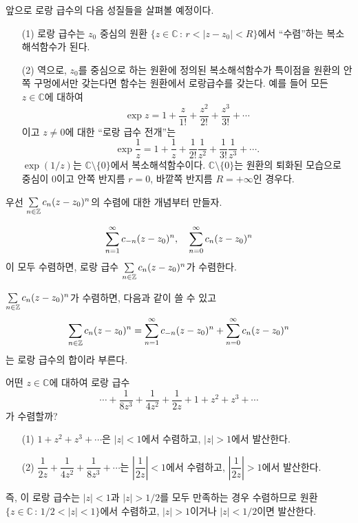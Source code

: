 앞으로 로랑 급수의 다음 성질들을 살펴볼 예정이다.
\begin{itemize}
\item[(1)] 로랑 급수는 $z_0$ 중심의 
원환 $\{ z\in \mathbb C \,:\, r < |z-z_0| <R\}$에서 ``수렴''하는
복소해석함수가 된다.
\item[(2)] 역으로, $z_0$를 중심으로 하는 원환에 정의된 복소해석함수가
특이점을 원환의 안쪽 구멍에서만 갖는다면
함수는 원환에서 로랑급수를 갖는다. 예를 들어 모든 $z\in \mathbb C$에 대하여
\[
\exp z = 1 + \dfrac{z}{1!} + \dfrac{z^2}{2!} + \dfrac{z^3}{3!} + \cdots
\]
이고 $z\ne0$에 대한 ``로랑 급수 전개''는
\[
\exp \dfrac1z = 1 + \dfrac{1}{z} + \dfrac{1}{2!}\dfrac1{z^2} + \dfrac{1}{3!}\dfrac1{z^3} + \cdots.
\]
$\exp(1/z)$는 $\mathbb C\setminus \{0\}$에서 복소해석함수이다.
$\mathbb C\setminus \{0\}$는 원환의 퇴화된 모습으로
중심이 $0$이고 안쪽 반지름 $r=0$, 바깥쪽 반지름 $R=+\infty$인 경우다.
\end{itemize}

우선 $\sum\limits_{n\in \mathbb Z} c_n(z-z_0)^n$의 수렴에 대한 개념부터 만들자.


\begin{saltdefinition}{}{} \label{def-4-3}
\[
\sum\limits_{n=1}^\infty c_{-n}(z-z_0)^n, \quad
\sum\limits_{n=0}^\infty c_{n}(z-z_0)^n
\]
이 모두 수렴하면, 
로랑 급수  $\sum\limits_{n\in \mathbb Z} c_n(z-z_0)^n$가 수렴한다.

$\sum\limits_{n\in \mathbb Z} c_n(z-z_0)^n$가 수렴하면, 다음과 같이 쓸 수 있고
\[
\sum\limits_{n\in \mathbb Z} c_n(z-z_0)^n
= \sum\limits_{n=1}^\infty c_{-n}(z-z_0)^n + \sum\limits_{n=0}^\infty c_{n}(z-z_0)^n
\]
는 로랑 급수의 합이라 부른다.
\end{saltdefinition}

\begin{saltexample}[label=example-4-10]{}{}
어떤 $z\in \mathbb C$에 대하여 로랑 급수
\[
\cdots + \dfrac1{8z^3} + \dfrac1{4z^2} + \dfrac1{2z} + 1 + z^2 + z^3 + \cdots
\]
가 수렴할까? 
\begin{itemize}
\item[(1)] $1 + z^2 + z^3 + \cdots$은 $|z|<1$에서 수렴하고, $|z|>1$에서 발산한다.
\item[(2)] $\dfrac1{2z} + \dfrac1{4z^2} +  \dfrac1{8z^3} + \cdots$는
$\left|\dfrac1{2z}\right|<1$에서 수렴하고, $\left|\dfrac1{2z}\right|>1$에서 발산한다.
\end{itemize}
즉, 이 로랑 급수는 $|z|<1$과 $|z|>1/2$를 모두 만족하는 경우 수렴하므로
원환 $\{ z\in \mathbb C\,:\, 1/2<|z|<1\}$에서 수렴하고,
$|z|>1$이거나 $|z|<1/2$이면 발산한다.
\end{saltexample}

